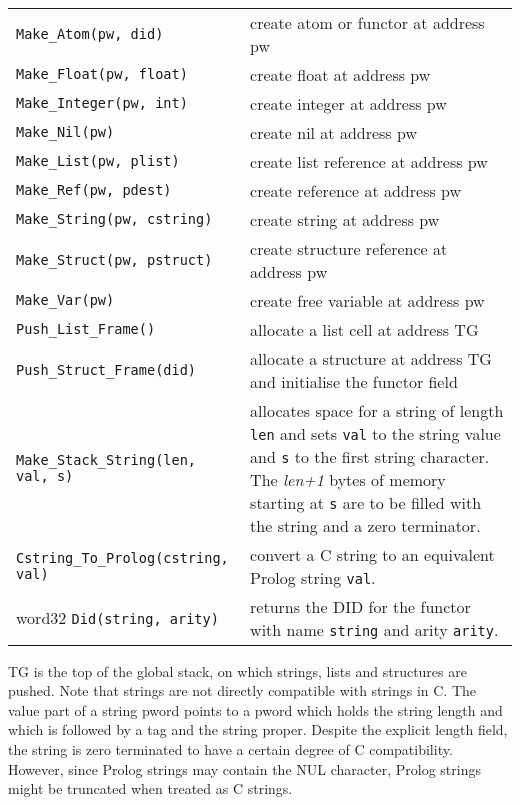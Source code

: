\noindent
 \\
\begin{tabular}{|p{7.3cm}p{8.0cm}|} 
\hline
{\tt Make_Atom(pw, did)} & create atom or functor at address pw\\
{\tt Make_Float(pw, float)} & create float at address pw\\
{\tt Make_Integer(pw, int)} & create integer at address pw\\
{\tt Make_Nil(pw)} & create nil at address pw\\
{\tt Make_List(pw, plist)} & create list reference at address pw\\
{\tt Make_Ref(pw, pdest)} & create reference at address pw\\
{\tt Make_String(pw, cstring)} & create string at address pw\\
{\tt Make_Struct(pw, pstruct)} & create structure reference at address pw\\
{\tt Make_Var(pw)} & create free variable at address pw\\
{\tt Push_List_Frame()} & allocate a list cell at address TG\\
{\tt Push_Struct_Frame(did)} & allocate a structure at address TG and 
initialise the functor field\\
{\tt Make_Stack_String(len, val, s)} &
allocates space for a string of length {\tt len} and sets {\tt val}
to the string value and {\tt s} to the first string character.
The {\it len+1} bytes of memory starting at {\tt s} are to be filled
with the string and a zero terminator.\\
{\tt Cstring_To_Prolog(cstring, val)} &
convert a C string to an equivalent Prolog string {\tt val}.\\
word32 {\tt Did(string, arity)} &
returns the DID for the functor with name {\tt string} and arity {\tt arity}.\\
\hline
\end{tabular}


\vspace*{0.5cm}

\noindent
TG is the top of the global stack, on which strings, lists and structures
are pushed.
Note that \eclipse strings are not directly compatible with strings in C.
The value part of a string pword points to a pword which holds
the string length and which is followed by  a tag and the string proper.
Despite the explicit length field, the string is zero terminated
to have a certain degree of C compatibility. However, since Prolog
strings may contain the NUL character, Prolog strings might be truncated
when treated as C strings.

